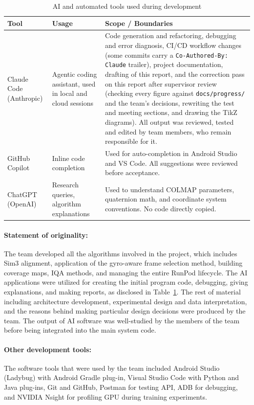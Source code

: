 \begin{table}[htbp]
\centering
\small
\caption{AI and automated tools used during development}
\label{tab:aitools}
\begin{tabular}{p{3cm}p{4cm}p{5cm}}
\toprule
\textbf{Tool} & \textbf{Usage} & \textbf{Scope / Boundaries} \\
\midrule
Claude Code (Anthropic) & Agentic coding assistant, used in local and cloud sessions & Code generation and refactoring, debugging and error diagnosis, CI/CD workflow changes (some commits carry a \texttt{Co-Authored-By: Claude} trailer), project documentation, drafting of this report, and the correction pass on this report after supervisor review (checking every figure against \texttt{docs/progress/} and the team's decisions, rewriting the test and meeting sections, and drawing the TikZ diagrams). All output was reviewed, tested and edited by team members, who remain responsible for it. \\
GitHub Copilot & Inline code completion & Used for auto-completion in Android Studio and VS Code. All suggestions were reviewed before acceptance. \\
ChatGPT (OpenAI) & Research queries, algorithm explanations & Used to understand COLMAP parameters, quaternion math, and coordinate system conventions. No code directly copied. \\
\bottomrule
\end{tabular}
\end{table}

\paragraph{Statement of originality:}
The team developed all the algorithms involved in the project, which includes Sim3 alignment, application of the gyro-aware frame selection method, building coverage maps, IQA methods, and managing the entire RunPod lifecycle. The AI applications were utilized for creating the initial program code, debugging, giving explanations, and making reports, as disclosed in Table~\ref{tab:aitools}. The rest of material including architecture development, experimental design and data interpretation, and the reasons behind making particular design decisions were produced by the team. The output of AI software was well-studied by the members of the team before being integrated into the main system code.

\paragraph{Other development tools:} The software tools that were used by the team included Android Studio (Ladybug) with Android Gradle plug-in, Visual Studio Code with Python and Java plug-ins, Git and GitHub, Postman for testing API, ADB for debugging, and NVIDIA Nsight for profiling GPU during training experiments.

